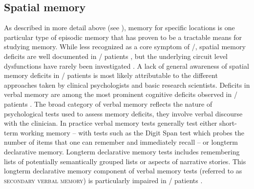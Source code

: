 \subsection{Spatial memory}\label{sec:intro:scz:spatial}
As described in more detail above (see ), memory for specific locations is one particular type of episodic memory that has proven to be a tractable means for studying memory.
While less recognized as a core symptom of \scz/, spatial memory deficits are well documented in \scz/ patients \citep{Boyer2007, Hanlon2006, Wilkins2013, Weniger2008}, but the underlying circuit level dysfunctions have rarely been investigated \citep{Hayashi2015, Suh2013}.
A lack of general awareness of spatial memory deficits in \scz/ patients is most likely attributable to the different approaches taken by clinical psychologists and basic research scientists.
Deficits in verbal memory are among the most prominent cognitive deficits observed in \scz/ patients \citep{O'Carroll2000}.
The broad category of verbal memory reflects the nature of psychological tests used to assess memory deficits, they involve verbal discourse with the clinician.
In practice verbal memory tests generally test either short-term working memory -- with tests such as the Digit Span test which probes the number of items that one can remember and immediately recall -- or longterm declarative memory.
Longterm declarative memory tests includes remembering lists of potentially semantically grouped lists or aspects of narrative stories.
This longterm declarative memory component of verbal memory tests (referred to as \textsc{secondary verbal memory}) is particularly impaired in \scz/ patients \citep{Green1996}.

